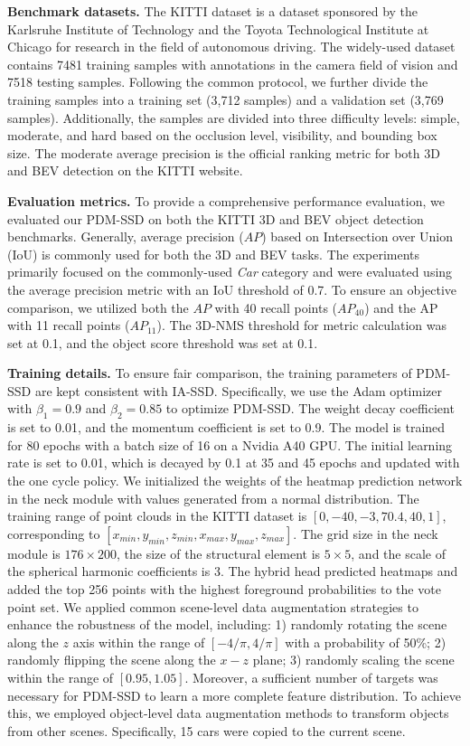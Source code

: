 

\textbf{Benchmark datasets.} The KITTI dataset is a dataset sponsored by the Karlsruhe Institute of Technology and the Toyota Technological Institute at Chicago for research in the field of autonomous driving. The widely-used dataset contains 7481 training samples with annotations in the camera field of vision and 7518 testing samples. Following the common protocol, we further divide the training samples into a training set (3,712 samples) and a validation set (3,769 samples). Additionally, the samples are divided into three difficulty levels: simple, moderate, and hard based on the occlusion level, visibility, and bounding box size. The moderate average precision is the official ranking metric for both 3D and BEV detection on the KITTI website.

\textbf{Evaluation metrics.} To provide a comprehensive performance evaluation, we evaluated our PDM-SSD on both the KITTI 3D and BEV object detection benchmarks. Generally, average precision ($AP$) based on Intersection over Union (IoU) is commonly used for both the 3D and BEV tasks. The experiments primarily focused on the commonly-used \textit{Car} category and were evaluated using the average precision metric with an IoU threshold of 0.7. To ensure an objective comparison, we utilized both the $AP$ with 40 recall points ($AP_{40}$) and the {AP} with 11 recall points ($AP_{11}$). The 3D-NMS threshold for metric calculation was set at 0.1, and the object score threshold was set at 0.1.

\textbf{Training details.} To ensure fair comparison, the training parameters of PDM-SSD are kept consistent with IA-SSD. Specifically, we use the Adam optimizer with $\beta_1=0.9$ and $\beta_2=0.85$ to optimize PDM-SSD. The weight decay coefficient is set to 0.01, and the momentum coefficient is set to 0.9. The model is trained for 80 epochs with a batch size of 16 on a Nvidia A40 GPU. The initial learning rate is set to 0.01, which is decayed by 0.1 at 35 and 45 epochs and updated with the one cycle policy. We initialized the weights of the heatmap prediction network in the neck module with values generated from a normal distribution. The training range of point clouds in the KITTI dataset is $[0,-40,-3,70.4,40,1]$, corresponding to $[x_{min},y_{min},z_{min},x_{max},y_{max},z_{max}]$. The grid size in the neck module is $176\times 200$, the size of the structural element is $5\times 5$, and the scale of the spherical harmonic coefficients is 3. The hybrid head predicted heatmaps and added the top 256 points with the highest foreground probabilities to the vote point set. We applied common scene-level data augmentation strategies to enhance the robustness of the model, including: 1) randomly rotating the scene along the $z$ axis within the range of $[-4/\pi,4/\pi]$ with a probability of 50\%; 2) randomly flipping the scene along the $x-z$ plane; 3) randomly scaling the scene within the range of $[0.95,1.05]$. Moreover, a sufficient number of targets was necessary for PDM-SSD to learn a more complete feature distribution. To achieve this, we employed object-level data augmentation methods to transform objects from other scenes. Specifically, 15 cars were copied to the current scene.

